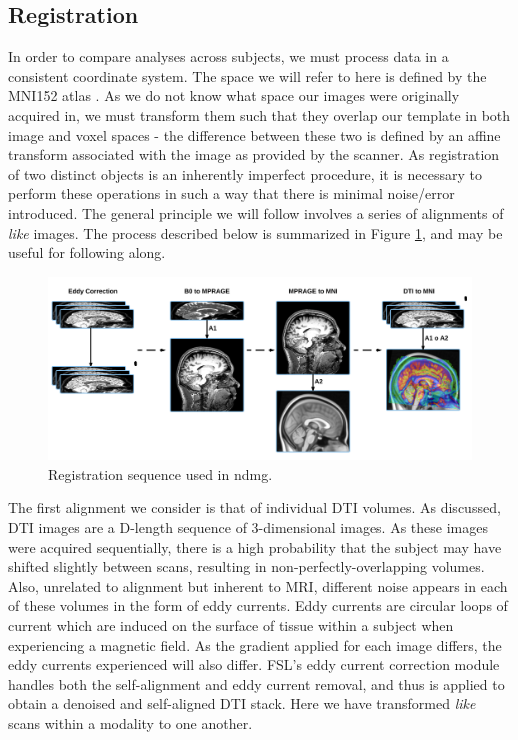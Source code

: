 \subsection{Registration}
\label{sec:reg}
In order to compare analyses across subjects, we must process data in a consistent coordinate system. The space we will refer to here is defined by the MNI152 atlas \cite{mni152}. As we do not know what space our images were originally acquired in, we must transform them such that they overlap our template in both image and voxel spaces - the difference between these two is defined by an affine transform associated with the image as provided by the scanner. As registration of two distinct objects is an inherently imperfect procedure, it is necessary to perform these operations in such a way that there is minimal noise/error introduced. The general principle we will follow involves a series of alignments of \textit{like} images. The process described below is summarized in Figure \ref{fig:ndmg-registration}, and may be useful for following along.
\begin{figure}[h!]
\centering
\includegraphics[width=1\textwidth]{./figs/ndmg_registration.png}
\makeatletter
\let\@currsize\normalsize
\caption{Registration sequence used in ndmg.}
\label{fig:ndmg-registration}
\end{figure}

The first alignment we consider is that of individual DTI volumes. As discussed, DTI images are a D-length sequence of 3-dimensional images. As these images were acquired sequentially, there is a high probability that the subject may have shifted slightly between scans, resulting in non-perfectly-overlapping volumes. Also, unrelated to alignment but inherent to MRI, different noise appears in each of these volumes in the form of eddy currents. Eddy currents are circular loops of current which are induced on the surface of tissue within a subject when experiencing a magnetic field. As the gradient applied for each image differs, the eddy currents experienced will also differ. FSL's eddy current correction module handles both the self-alignment and eddy current removal, and thus is applied to obtain a denoised and self-aligned DTI stack. Here we have transformed \textit{like} scans within a modality to one another.


